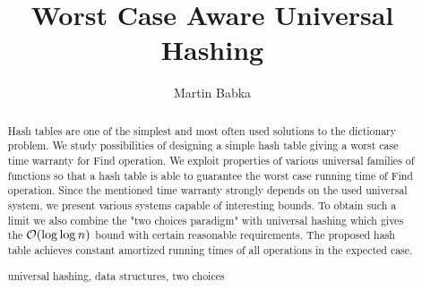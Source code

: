 \documentclass[runningheads,a4paper]{llncs}
\newcommand{\keywords}[1]{\par\addvspace\baselineskip
\noindent\keywordname\enspace\ignorespaces#1}
\begin{document}
\mainmatter

\author{Martin Babka}

\title{Worst Case Aware Universal Hashing}



\maketitle

\begin{abstract}
Hash tables are one of the simplest and most often used solutions to the dictionary problem. 
We study possibilities of designing a simple hash table giving a worst case time warranty for Find operation.
We exploit properties of various universal families of functions so that a hash table is able to guarantee the worst case running time of Find operation.
Since the mentioned time warranty strongly depends on the used universal system, we present various systems capable of interesting bounds.
To obtain such a limit we also combine the "two choices paradigm" with universal hashing which gives the $\mathcal{O}(\log \log n)$ bound with certain reasonable requirements.
The proposed hash table achieves constant amortized running times of all operations in the expected case.

\keywords{universal hashing, data structures, two choices}
\end{abstract}









\end{document}
